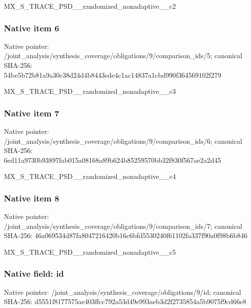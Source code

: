 \documentclass[10pt,a4paper]{article}
\begin{document}
\begingroup\raggedright\sloppy MX\_\allowbreak{}S\_\allowbreak{}TRACE\_\allowbreak{}PSD\_\allowbreak{}\_\allowbreak{}randomized\_\allowbreak{}nonadaptive\_\allowbreak{}\_\allowbreak{}c2\par\endgroup

\subsubsection{Native item 6}
Native pointer: /joint\_\allowbreak{}analysis/synthesis\_\allowbreak{}coverage/obligations/9/comparison\_\allowbreak{}ids/5; canonical SHA-256: 54be5b72b81a9a30c38d24d4b8443ede4c1ac14837a1cbd990f364569102f279

\begingroup\raggedright\sloppy MX\_\allowbreak{}S\_\allowbreak{}TRACE\_\allowbreak{}PSD\_\allowbreak{}\_\allowbreak{}randomized\_\allowbreak{}nonadaptive\_\allowbreak{}\_\allowbreak{}c3\par\endgroup

\subsubsection{Native item 7}
Native pointer: /joint\_\allowbreak{}analysis/synthesis\_\allowbreak{}coverage/obligations/9/comparison\_\allowbreak{}ids/6; canonical SHA-256: 6ed11a9730b93897fab015a08168a89b624b85259570bb32f830f567ae2a2d45

\begingroup\raggedright\sloppy MX\_\allowbreak{}S\_\allowbreak{}TRACE\_\allowbreak{}PSD\_\allowbreak{}\_\allowbreak{}randomized\_\allowbreak{}nonadaptive\_\allowbreak{}\_\allowbreak{}c4\par\endgroup

\subsubsection{Native item 8}
Native pointer: /joint\_\allowbreak{}analysis/synthesis\_\allowbreak{}coverage/obligations/9/comparison\_\allowbreak{}ids/7; canonical SHA-256: 46a069534d87fa8047216420b16c6bfd5530240f61102fa337f90a0f98b6b846

\begingroup\raggedright\sloppy MX\_\allowbreak{}S\_\allowbreak{}TRACE\_\allowbreak{}PSD\_\allowbreak{}\_\allowbreak{}randomized\_\allowbreak{}nonadaptive\_\allowbreak{}\_\allowbreak{}c5\par\endgroup

\subsubsection{Native field: id}
Native pointer: /joint\_\allowbreak{}analysis/synthesis\_\allowbreak{}coverage/obligations/9/id; canonical SHA-256: d5551f8177575ae403ffcc792a53d49e993aeb3d2f2735854a5b9075f9cd66e8
\end{document}
